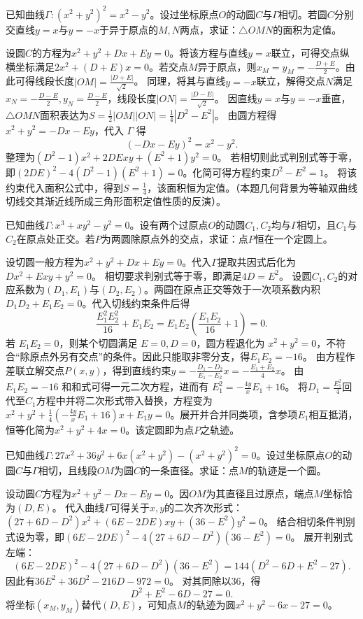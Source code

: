 \begin{example}
已知曲线$\Gamma: (x^2+y^2)^2 = x^2-y^2$。设过坐标原点$O$的动圆$C$与$\Gamma$相切。若圆$C$分别交直线$y=x$与$y=-x$于异于原点的$M, N$两点，求证：$\triangle OMN$的面积为定值。
\end{example}
\begin{solution}
设圆$C$的方程为$x^2+y^2+Dx+Ey=0$。将该方程与直线$y=x$联立，可得交点纵横坐标满足$2x^2+(D+E)x=0$。若交点$M$异于原点，则$x_M=y_M=-\frac{D+E}{2}$。由此可得线段长度$|OM|=\frac{|D+E|}{\sqrt{2}}$。
同理，将其与直线$y=-x$联立，解得交点$N$满足$x_N=-\frac{D-E}{2}, y_N=\frac{D-E}{2}$，线段长度$|ON|=\frac{|D-E|}{\sqrt{2}}$。
因直线$y=x$与$y=-x$垂直，$\triangle OMN$面积表达为$S = \frac{1}{2}|OM||ON| = \frac{1}{4}|D^2-E^2|$。
由圆方程得 $x^2+y^2=-Dx-Ey$，代入 $\Gamma$ 得
\[
(-Dx-Ey)^2=x^2-y^2.
\]
整理为$(D^2-1)x^2 + 2DExy + (E^2+1)y^2 = 0$。
若相切则此式判别式等于零，即$(2DE)^2 - 4(D^2-1)(E^2+1) = 0$。化简可得方程约束$D^2 - E^2 = 1$。
将该约束代入面积公式中，得到$S = \frac{1}{4}$，该面积恒为定值。（本题几何背景为等轴双曲线切线交其渐近线所成三角形面积定值性质的反演）。
\end{solution}

\begin{example}
已知曲线$\Gamma: x^3+xy^2-y^2=0$。设有两个过原点$O$的动圆$C_1, C_2$均与$\Gamma$相切，且$C_1$与$C_2$在原点处正交。若$P$为两圆除原点外的交点，求证：点$P$恒在一个定圆上。
\end{example}
\begin{solution}
设切圆一般方程为$x^2+y^2+Dx+Ey=0$。代入$\Gamma$提取共因式后化为$Dx^2+Exy+y^2=0$。
相切要求判别式等于零，即满足$4D=E^2$。
设圆$C_1, C_2$的对应系数为$(D_1, E_1)$与$(D_2, E_2)$。两圆在原点正交等效于一次项系数内积$D_1D_2+E_1E_2=0$。代入切线约束条件后得
\[
\frac{E_1^2E_2^2}{16}+E_1E_2=E_1E_2\left(\frac{E_1E_2}{16}+1\right)=0.
\]
若 $E_1E_2=0$，则某个切圆满足 $E=0,D=0$，圆方程退化为 $x^2+y^2=0$，不符合“除原点外另有交点”的条件。因此只能取非零分支，得$E_1E_2 = -16$。
由方程作差联立解交点$P(x,y)$，得到直线约束$y = -\frac{D_1-D_2}{E_1-E_2}x = -\frac{E_1+E_2}{4}x$。
由 $E_1E_2=-16$ 和和式可得一元二次方程，进而有 $E_1^2 = -\frac{4y}{x}E_1 + 16$。
将$D_1=\frac{E_1^2}{4}$回代至$C_1$方程中并将二次形式带入替换，方程变为$x^2+y^2+\frac{1}{4}(-\frac{4y}{x}E_1 + 16)x+E_1y=0$。展开并合并同类项，含参项$E_1$相互抵消，恒等化简为$x^2+y^2+4x=0$。该定圆即为点$P$之轨迹。
\end{solution}

\begin{example}
已知曲线$\Gamma: 27x^2+36y^2+6x(x^2+y^2)-(x^2+y^2)^2=0$。设过坐标原点$O$的动圆$C$与$\Gamma$相切，且线段$OM$为圆$C$的一条直径。求证：点$M$的轨迹是一个圆。
\end{example}
\begin{solution}
设动圆$C$方程为$x^2+y^2-Dx-Ey=0$。因$OM$为其直径且过原点，端点$M$坐标恰为$(D, E)$。
代入曲线$\Gamma$可得关于$x,y$的二次齐次形式：$(27+6D-D^2)x^2 + (6E-2DE)xy + (36-E^2)y^2 = 0$。
结合相切条件判别式设为零，即$(6E-2DE)^2 - 4(27+6D-D^2)(36-E^2) = 0$。
展开判别式左端：
\[
(6E-2DE)^2 - 4(27+6D-D^2)(36-E^2)
=144(D^2-6D+E^2-27).
\]
因此有$36E^2 + 36D^2 - 216D - 972 = 0$。
对其同除以$36$，得
\[
D^2+E^2-6D-27=0.
\]
将坐标$(x_M, y_M)$替代$(D, E)$，可知点$M$的轨迹为圆$x^2+y^2-6x-27=0$。
\end{solution}

